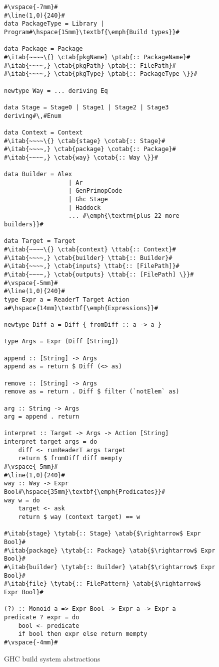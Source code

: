 \begin{figure}
\begin{lstlisting}
#\vspace{-7mm}#
#\line(1,0){240}#
data PackageType = Library | Program#\hspace{15mm}\textbf{\emph{Build types}}#

data Package = Package
#\itab{~~~~\{} \ctab{pkgName} \ptab{:: PackageName}#
#\itab{~~~~,} \ctab{pkgPath} \ptab{:: FilePath}#
#\itab{~~~~,} \ctab{pkgType} \ptab{:: PackageType \}}#

newtype Way = ... deriving Eq

data Stage = Stage0 | Stage1 | Stage2 | Stage3 deriving#\,#Enum

data Context = Context
#\itab{~~~~\{} \ctab{stage} \cotab{:: Stage}#
#\itab{~~~~,} \ctab{package} \cotab{:: Package}#
#\itab{~~~~,} \ctab{way} \cotab{:: Way \}}#

data Builder = Alex
                  | Ar
                  | GenPrimopCode
                  | Ghc Stage
                  | Haddock
                  ... #\emph{\textrm{plus 22 more builders}}#

data Target = Target
#\itab{~~~~\{} \ctab{context} \ttab{:: Context}#
#\itab{~~~~,} \ctab{builder} \ttab{:: Builder}#
#\itab{~~~~,} \ctab{inputs} \ttab{:: [FilePath]}#
#\itab{~~~~,} \ctab{outputs} \ttab{:: [FilePath] \}}#
#\vspace{-5mm}#
#\line(1,0){240}#
type Expr a = ReaderT Target Action a#\hspace{14mm}\textbf{\emph{Expressions}}#

newtype Diff a = Diff { fromDiff :: a -> a }

type Args = Expr (Diff [String])

append :: [String] -> Args
append as = return $ Diff (<> as)

remove :: [String] -> Args
remove as = return . Diff $ filter (`notElem` as)

arg :: String -> Args
arg = append . return

interpret :: Target -> Args -> Action [String]
interpret target args = do
    diff <- runReaderT args target
    return $ fromDiff diff mempty
#\vspace{-5mm}#
#\line(1,0){240}#
way :: Way -> Expr Bool#\hspace{35mm}\textbf{\emph{Predicates}}#
way w = do
    target <- ask
    return $ way (context target) == w

#\itab{stage} \tytab{:: Stage} \atab{$\rightarrow$ Expr Bool}#
#\itab{package} \tytab{:: Package} \atab{$\rightarrow$ Expr Bool}#
#\itab{builder} \tytab{:: Builder} \atab{$\rightarrow$ Expr Bool}#
#\itab{file} \tytab{:: FilePattern} \atab{$\rightarrow$ Expr Bool}#

(?) :: Monoid a => Expr Bool -> Expr a -> Expr a
predicate ? expr = do
    bool <- predicate
    if bool then expr else return mempty
#\vspace{-4mm}#
\end{lstlisting}
\caption{GHC build system abstractions\label{fig:abstractions}}
\end{figure}

